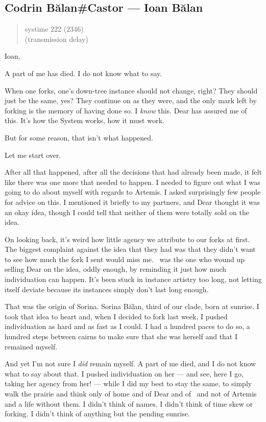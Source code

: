 \hypertarget{codrin-bux103lancastor-ioan-bux103lan}{%
\subsection{Codrin Bălan\#Castor — Ioan Bălan}\label{codrin-bux103lancastor-ioan-bux103lan}}

\begin{quote}
systime 222 (2346)\\
(transmission delay)
\end{quote}

Ioan,

A part of me has died. I do not know what to say.

When one forks, one's down-tree instance should not change, right? They should just be the same, yes? They continue on as they were, and the only mark left by forking is the memory of having done so. I \emph{know} this. Dear has assured me of this. It's how the System works, how it must work.

But for some reason, that isn't what happened.

Let me start over.

After all that happened, after all the decisions that had already been made, it felt like there was one more that needed to happen. I needed to figure out what I was going to do about myself with regards to Artemis. I asked surprisingly few people for advice on this. I mentioned it briefly to my partners, and Dear thought it was an okay idea, though I could tell that neither of them were totally sold on the idea.

On looking back, it's weird how little agency we attribute to our forks at first. The biggest complaint against the idea that they had was that they didn't want to see how much the fork I sent would miss me. \Partner \ was the one who wound up selling Dear on the idea, oddly enough, by reminding it just how much individuation can happen. It's been stuck in instance artistry too long, not letting itself deviate because its instances simply don't last long enough.

That was the origin of Sorina. Sorina Bălan, third of our clade, born at sunrise. I took that idea to heart and, when I decided to fork last week, I pushed individuation as hard and as fast as I could. I had a hundred paces to do so, a hundred steps between cairns to make sure that she was herself and that I remained myself.

And yet I'm not sure I \emph{did} remain myself. A part of me died, and I do not know what to say about that. I pushed individuation on her — and see, here I go, taking her agency from her! — while I did my best to stay the same, to simply walk the prairie and think only of home and of Dear and of \Partner \ and not of Artemis and a life without them. I didn't think of names. I didn't think of time skew or forking. I didn't think of anything but the pending sunrise.

